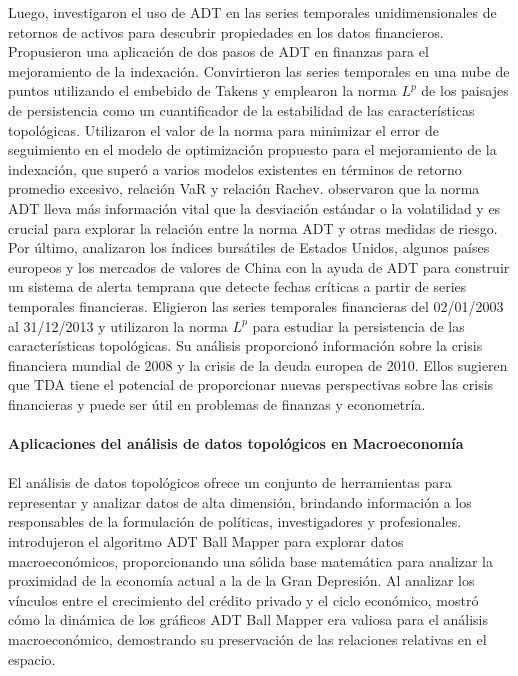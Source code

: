 Luego, \cite{GOEL2020113222} investigaron el uso de ADT en las series temporales unidimensionales de retornos de activos para descubrir propiedades en los datos financieros. Propusieron una aplicación de dos pasos de ADT en finanzas para el mejoramiento de la indexación. Convirtieron las series temporales en una nube de puntos utilizando el embebido de Takens y emplearon la norma $L^p$ de los paisajes de persistencia como un cuantificador de la estabilidad de las características topológicas. Utilizaron el valor de la norma para minimizar el error de seguimiento en el modelo de optimización propuesto para el mejoramiento de la indexación, que superó a varios modelos existentes en términos de retorno promedio excesivo, relación VaR y relación Rachev. \cite{GOEL2020113222} observaron que la norma ADT lleva más información vital que la desviación estándar o la volatilidad y es crucial para explorar la relación entre la norma ADT y otras medidas de riesgo.\\

Por último, \cite{GUO2020124956} analizaron los índices bursátiles de Estados Unidos, algunos países europeos y los mercados de valores de China con la ayuda de ADT para construir un sistema de alerta temprana que detecte fechas críticas a partir de series temporales financieras. Eligieron las series temporales financieras del 02/01/2003 al 31/12/2013 y utilizaron la norma $L^p$ para estudiar la persistencia de las características topológicas. Su análisis proporcionó información sobre la crisis financiera mundial de 2008 y la crisis de la deuda europea de 2010. Ellos sugieren que TDA tiene el potencial de proporcionar nuevas perspectivas sobre las crisis financieras y puede ser útil en problemas de finanzas y econometría.\\\\


\textbf{Aplicaciones del análisis de datos topológicos en Macroeconomía}\\\\

El análisis de datos topológicos ofrece un conjunto de herramientas para representar y analizar datos de alta dimensión, brindando información a los responsables de la formulación de políticas, investigadores y profesionales. \cite{dlotko2019topologically} introdujeron el algoritmo ADT Ball Mapper para explorar datos macroeconómicos, proporcionando una sólida base matemática para analizar la proximidad de la economía actual a la de la Gran Depresión. Al analizar los vínculos entre el crecimiento del crédito privado y el ciclo económico, \cite{dlotko2019topologically} mostró cómo la dinámica de los gráficos ADT Ball Mapper era valiosa para el análisis macroeconómico, demostrando su preservación de las relaciones relativas en el espacio. \\

